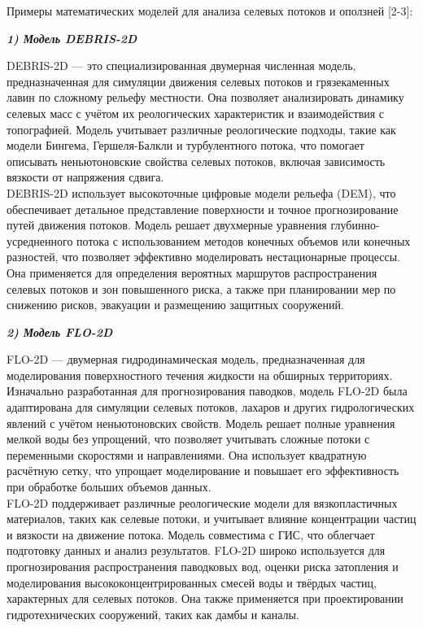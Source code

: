 Примеры математических моделей для анализа селевых потоков и оползней
{[}2-3{]}:

\emph{{\bfseries 1) Модель DEBRIS-2D}}

DEBRIS-2D --- это специализированная двумерная численная модель,
предназначенная для симуляции движения селевых потоков и грязекаменных
лавин по сложному рельефу местности. Она позволяет анализировать
динамику селевых масс с учётом их реологических характеристик и
взаимодействия с топографией. Модель учитывает различные реологические
подходы, такие как модели Бингема, Гершеля-Балкли и турбулентного
потока, что помогает описывать неньютоновские свойства селевых потоков,
включая зависимость вязкости от напряжения сдвига.\\
DEBRIS-2D использует высокоточные цифровые модели рельефа (DEM), что
обеспечивает детальное представление поверхности и точное
прогнозирование путей движения потоков. Модель решает двухмерные
уравнения глубинно-усредненного потока с использованием методов конечных
объемов или конечных разностей, что позволяет эффективно моделировать
нестационарные процессы. Она применяется для определения вероятных
маршрутов распространения селевых потоков и зон повышенного риска, а
также при планировании мер по снижению рисков, эвакуации и размещению
защитных сооружений.

\emph{{\bfseries 2) Модель FLO-2D}}

FLO-2D --- двумерная гидродинамическая модель, предназначенная для
моделирования поверхностного течения жидкости на обширных территориях.
Изначально разработанная для прогнозирования паводков, модель FLO-2D
была адаптирована для симуляции селевых потоков, лахаров и других
гидрологических явлений с учётом неньютоновских свойств. Модель решает
полные уравнения мелкой воды без упрощений, что позволяет учитывать
сложные потоки с переменными скоростями и направлениями. Она использует
квадратную расчётную сетку, что упрощает моделирование и повышает его
эффективность при обработке больших объемов данных.\\
FLO-2D поддерживает различные реологические модели для вязкопластичных
материалов, таких как селевые потоки, и учитывает влияние концентрации
частиц и вязкости на движение потока. Модель совместима с ГИС, что
облегчает подготовку данных и анализ результатов. FLO-2D широко
используется для прогнозирования распространения паводковых вод, оценки
риска затопления и моделирования высококонцентрированных смесей воды и
твёрдых частиц, характерных для селевых потоков. Она также применяется
при проектировании гидротехнических сооружений, таких как дамбы и
каналы.

